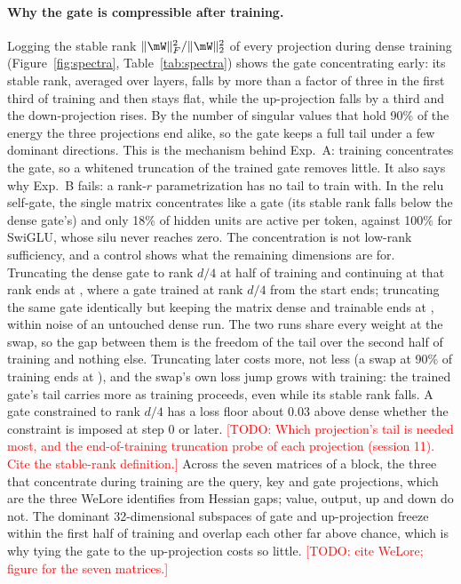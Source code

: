 \documentclass{article}
\newcommand{\todo}[1]{\textcolor{red}{[TODO: #1]}}
\begin{document}
\paragraph{Why the gate is compressible after training.} Logging the stable rank
$\|\mW\|_F^2 / \|\mW\|_2^2$ of every projection during dense training (Figure~\ref{fig:spectra},
Table~\ref{tab:spectra}) shows the gate concentrating early: its stable rank, averaged over layers, falls by
more than a factor of three in the first third of training and then stays flat, while the up-projection falls
by a third and the down-projection rises. By the number of singular values that hold 90\% of the energy the
three projections end alike, so the gate keeps a full tail under a few dominant directions. This is the
mechanism behind Exp.~A: training concentrates the gate, so a whitened truncation of the trained gate removes
little. It also says why Exp.~B fails: a rank-$r$ parametrization has no tail to train with. In the relu
self-gate, the single matrix concentrates like a gate (its stable rank falls below the dense gate's) and only
18\% of hidden units are active per token, against 100\% for SwiGLU, whose silu never reaches zero.
The concentration is not low-rank sufficiency, and a control shows what the remaining dimensions are for.
Truncating the dense gate to rank $d/4$ at half of training and continuing at that rank ends at
\meanWarmGateRFourFFifty{}, where a gate trained at rank $d/4$ from the start ends; truncating the same gate
identically but keeping the matrix dense and trainable ends at \meanWarmDenseRFourFFifty{}, within noise of an
untouched dense run. The two runs share every weight at the swap, so the gap between them is the freedom of
the tail over the second half of training and nothing else. Truncating later costs more, not less (a swap at
90\% of training ends at \meanWarmGateRFourFNinety{}), and the swap's own loss jump grows with training: the
trained gate's tail carries more as training proceeds, even while its stable rank falls. A gate constrained to
rank $d/4$ has a loss floor about 0.03 above dense whether the constraint is imposed at step 0 or later.
\todo{Which projection's tail is needed most, and the end-of-training truncation probe of each projection
(session 11). Cite the stable-rank definition.} Across the seven matrices of a block, the three that
concentrate during training are the query, key and gate projections, which are the three WeLore identifies
from Hessian gaps; value, output, up and down do not. The dominant 32-dimensional subspaces of gate and
up-projection freeze within the first half of training and overlap each other far above chance, which is why
tying the gate to the up-projection costs so little. \todo{cite WeLore; figure for the seven matrices.}
\end{document}
